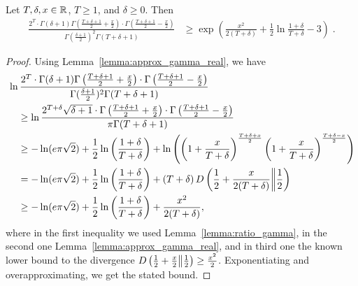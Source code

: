 \begin{lemma}
\label{lemma:lower_bound_gamma}
Let $T,\delta,x \in \mathbb{R}$, $T\geq1$, and $\delta\geq0$. Then
\begin{align*}
\frac{2^T \cdot \Gamma(\delta+1) \Gamma \left(\frac{T+\delta+1}{2} + \frac{x}{2} \right) \cdot \Gamma \left(\frac{T+\delta+1}{2} - \frac{x}{2} \right)}{ \Gamma(\frac{\delta+1}{2})^2 \Gamma(T+\delta+1)} 
&\geq\exp\left(\frac{x^2}{2(T+\delta)} +\frac{1}{2} \ln \frac{1+\delta}{T+\delta} -3\right) \;.
\end{align*}
\end{lemma}
\begin{proof}
Using Lemma~\ref{lemma:approx_gamma_real}, we have
\begin{align*}
&\ln \frac{2^T \cdot \Gamma(\delta+1) \Gamma \left(\frac{T+\delta+1}{2} + \frac{x}{2} \right) \cdot \Gamma \left(\frac{T+\delta+1}{2} - \frac{x}{2} \right)}{ \Gamma(\frac{\delta+1}{2})^2 \Gamma(T+\delta+1)} \\
&\quad \geq \ln \frac{2^{T+\delta} \sqrt{\delta+1} \cdot \Gamma \left(\frac{T+\delta+1}{2} + \frac{x}{2} \right) \cdot \Gamma \left(\frac{T+\delta+1}{2} - \frac{x}{2} \right)}{ \pi \Gamma(T+\delta+1)} \\
&\quad \geq -\ln(e \pi \sqrt{2}) +\frac{1}{2} \ln\left(\frac{1+\delta}{T+\delta}\right) +\ln \left(\left( 1+\frac{x}{T+\delta} \right)^\frac{T+\delta+x}{2} \left( 1+\frac{x}{T+\delta} \right)^\frac{T+\delta-x}{2}\right) \\
&\quad = -\ln(e \pi \sqrt{2}) +\frac{1}{2} \ln\left(\frac{1+\delta}{T+\delta}\right)+ (T+\delta) \, D\left({\frac{1}{2}+\frac{x}{2(T+\delta)}}\middle\|{\frac{1}{2}}\right) \\
&\quad \geq -\ln(e \pi \sqrt{2}) +\frac{1}{2} \ln\left(\frac{1+\delta}{T+\delta}\right)+ \frac{x^2}{2(T+\delta)} ,
\end{align*}
where in the first inequality we used Lemma~\ref{lemma:ratio_gamma}, in the second one Lemma~\ref{lemma:approx_gamma_real}, and in third one the known lower bound to the divergence $D\left({\frac{1}{2}+\frac{x}{2}}\middle\|{\frac{1}{2}}\right) \geq \frac{x^2}{2}$. Exponentiating and overapproximating, we get the stated bound.
\end{proof}


